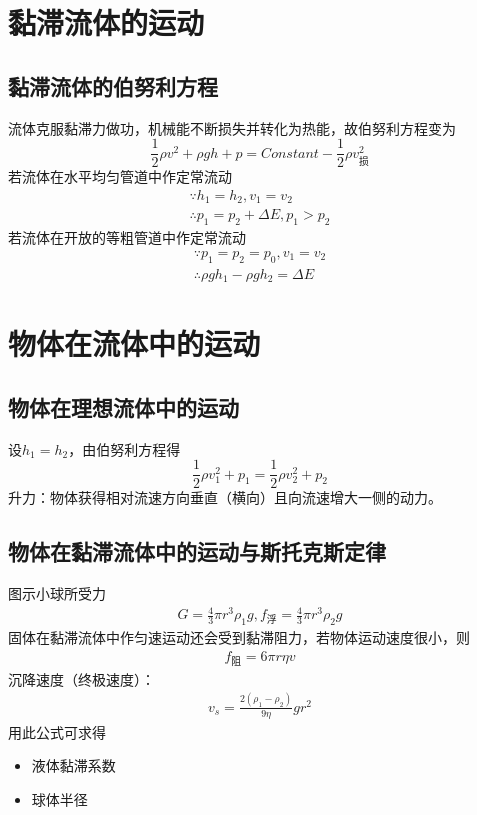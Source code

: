 \documentclass[12pt, a4paper, oneside]{ctexbook}
\begin{document}
\section{黏滞流体的运动}

\subsection{黏滞流体的伯努利方程}
流体克服黏滞力做功，机械能不断损失并转化为热能，故伯努利方程变为
\begin{equation*}
    \frac{1}{2} \rho v^2 + \rho gh + p = Constant - \frac{1}{2} \rho v^2_{\text{损}}
\end{equation*}
若流体在水平均匀管道中作定常流动
\begin{align*}
    \because h_1 = h_2,  v_1 = v_2 \\
    \therefore p_1 = p_2 + \Delta E, p_1 > p_2
\end{align*}
若流体在开放的等粗管道中作定常流动
\begin{align*}
    \because p_1 = p_2 = p_0,  v_1 = v_2 \\
    \therefore \rho gh_1 -\rho gh_2 =  \Delta E
\end{align*}

\section{物体在流体中的运动}
\subsection{物体在理想流体中的运动}
设$h_1 = h_2$，由伯努利方程得
\begin{equation*}
    \frac{1}{2} \rho v_1^2 + p_1 = \frac{1}{2} \rho v_2^2 + p_2
\end{equation*}
升力：物体获得相对流速方向垂直（横向）且向流速增大一侧的动力。

\subsection{物体在黏滞流体中的运动与斯托克斯定律}
图示小球所受力
\begin{align*}
    G = \frac{4}{3}\pi r^3 \rho_1 g, f_浮 = \frac{4}{3}\pi r^3 \rho_2 g
\end{align*}
固体在黏滞流体中作匀速运动还会受到黏滞阻力，若物体运动速度很小，则
\begin{align*}
    f_阻 = 6\pi r \eta v
\end{align*}
沉降速度（终极速度）：
\begin{align}
    v_s = \frac{2(\rho_1 - \rho_2)}{9\eta}gr^2
\end{align}
用此公式可求得
\begin{itemize}
    \item 液体黏滞系数
    \item 球体半径
\end{itemize}
\end{document}
